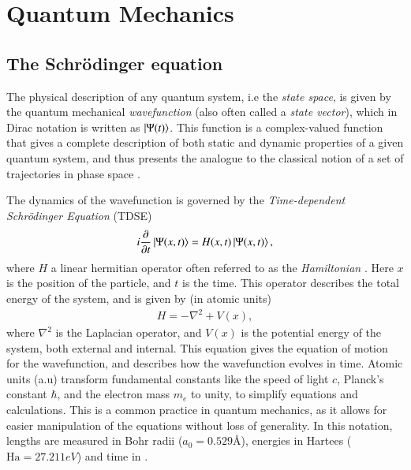 \documentclass{subfiles}
\begin{document}
\section{Quantum Mechanics}
\subsection{The Schrödinger equation}
The physical description of any quantum system, i.e the \emph{state space}, is given by the quantum mechanical \emph{wavefunction} (also often called a \emph{state vector})\cite{nielsen2010quantum}, which in Dirac notation is written as $\ket{\Psi(t)}$. 
This function is a complex-valued function that gives a complete description of both static and dynamic properties of a given quantum system, and thus presents the analogue to the classical notion of a set of trajectories in phase space \cite{hochstuhl2014time}. 

The dynamics of the wavefunction is governed by the \emph{Time-dependent Schrödinger Equation} (TDSE)
\begin{equation}
    i\frac{\partial}{\partial t}\ket{\Psi(x, t)} = H(x,t)\ket{\Psi(x, t)}\label{eq:tdse},
\end{equation}
where $H$ a linear hermitian operator often referred to as the \emph{Hamiltonian} \cite{griffiths2018introduction, berera2021quantum}. Here $x$ is the position of the particle, and $t$ is the time. 
This operator describes the total energy of the system, and is given by (in atomic units)
\begin{align*}
    H = -\nabla^2 + V(x),
\end{align*}
where $\nabla^2$ is the Laplacian operator, and $V(x)$ is the potential energy of the system, both external and internal.
This equation gives the equation of motion for the wavefunction, and describes how the wavefunction evolves in time. Atomic units (a.u) transform fundamental constants like the speed of light $c$, Planck's constant $\hbar$, and the electron mass $m_e$ to unity, to simplify equations and calculations. This is a common practice in quantum mechanics, as it allows for easier manipulation of the equations without loss of generality. In this notation, lengths are measured in Bohr radii ($ a_0 = 0.529Å$), energies in Hartees ($ \text{Ha} = 27.211 eV$) and time in  \cite{szabo1996modern}.
\end{document}

